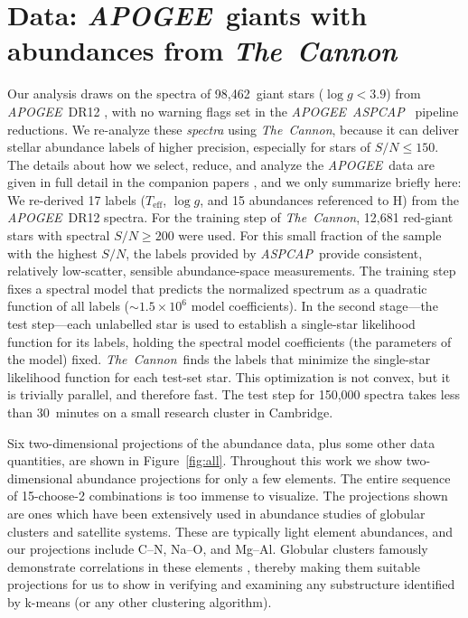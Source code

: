 \documentclass[manuscript, letterpaper]{aastex6}
\newcommand{\acronym}[1]{{\small{#1}}}
\newcommand{\project}[1]{\textsl{#1}}
\newcommand{\apogee}{\project{\acronym{APOGEE}}}
\newcommand{\aspcap}{\project{\acronym{ASPCAP}}}
\newcommand{\thecannon}{\project{The~Cannon}}
\renewcommand{\figurename}{Figure} %
\newcommand{\teff}{T_{\mathrm{eff}}}
\newcommand{\logg}{\log g}
\newcommand{\totalnumber}{98,462}
\begin{document}
\section{Data: \apogee\ giants with abundances from \thecannon}\label{sec:data}

Our analysis draws on the spectra of \totalnumber\ giant stars ($\logg
< 3.9$) from \apogee\ \acronym{DR12} \citep{apogeedr12}, with no warning flags
set in the \apogee\ \aspcap\ \citep{aspcap} pipeline
reductions.
We re-analyze these \emph{spectra} using \thecannon, because it can
deliver stellar abundance labels of higher precision, especially for
stars of $S/N \le 150$.
The details about how we select, reduce, and analyze the \apogee\ data
are given in full detail in the companion papers \citep{casey16,
  ness16}, and we only summarize briefly here:
We re-derived 17 labels ($\teff$, $\logg$, and 15 abundances
referenced to H) from the \apogee\ \acronym{DR12} spectra. 
For the training step of \thecannon, 
12,681 red-giant stars with spectral $S/N \ge 200$ were used.
For this small fraction of the sample with the highest $S/N$, the
labels provided by \aspcap\ provide consistent, relatively low-scatter, sensible
abundance-space measurements.
The training step fixes a spectral model
that predicts the normalized spectrum as a quadratic function of all
labels ($\sim 1.5\times10^6$ model coefficients). In the second stage---the test step---each unlabelled star is
used to establish a single-star likelihood function for its labels,
holding the spectral model coefficients (the parameters of the model) fixed.
\thecannon\ finds the labels that minimize the single-star likelihood
function for each test-set star.
This optimization is not convex, but it is trivially parallel,
and therefore fast. The test
step for 150,000 spectra takes less than 30~minutes on a small 
research cluster in Cambridge.

Six two-dimensional projections of the abundance data, plus some other
data quantities, are shown in \figurename~\ref{fig:all}.  Throughout
this work we show two-dimensional abundance projections for only a few
elements. The entire sequence of 15-choose-2 combinations is too
immense to visualize. The projections shown are ones which
have been extensively used in abundance studies of globular clusters
and satellite systems. These are typically light element abundances,
and our projections include C--N, Na--O, and Mg--Al. Globular clusters
famously demonstrate correlations in these elements \citep[for example,][and references therein]{Norris_1995,Carretta_2009}, thereby making
them suitable projections for us to show in verifying and examining
any substructure identified by k-means (or any other clustering algorithm).
\end{document}
